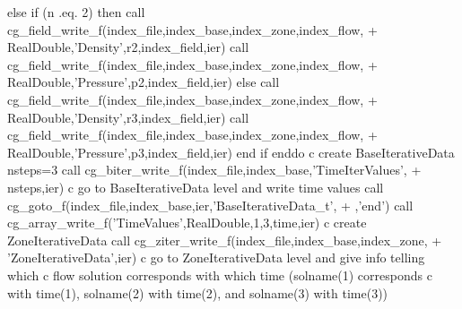 \documentclass[12pt]{article}
\begin{document}
{\newline\indent      else if (n .eq. 2) then
\newline\indent      call cg\_field\_write\_f(index\_file,index\_base,index\_zone,index\_flow,
\newline + \indent RealDouble,'Density',r2,index\_field,ier)
\newline\indent      call cg\_field\_write\_f(index\_file,index\_base,index\_zone,index\_flow,
\newline + \indent RealDouble,'Pressure',p2,index\_field,ier)
\newline\indent      else
\newline\indent      call cg\_field\_write\_f(index\_file,index\_base,index\_zone,index\_flow,
\newline + \indent RealDouble,'Density',r3,index\_field,ier)
\newline\indent      call cg\_field\_write\_f(index\_file,index\_base,index\_zone,index\_flow,
\newline + \indent RealDouble,'Pressure',p3,index\_field,ier)
\newline\indent      end if
\newline\indent      enddo
\newline c   create BaseIterativeData
\newline\indent      nsteps=3
\newline\indent      call cg\_biter\_write\_f(index\_file,index\_base,'TimeIterValues',
\newline + \indent nsteps,ier)
\newline c   go to BaseIterativeData level and write time values
\newline\indent      call cg\_goto\_f(index\_file,index\_base,ier,'BaseIterativeData\_t',
\newline + ,'end')
\newline\indent      call cg\_array\_write\_f('TimeValues',RealDouble,1,3,time,ier)
\newline c   create ZoneIterativeData
\newline\indent      call cg\_ziter\_write\_f(index\_file,index\_base,index\_zone,
\newline + \indent 'ZoneIterativeData',ier)
\newline c   go to ZoneIterativeData level and give info telling which
\newline c   flow solution corresponds with which time (solname(1) corresponds
\newline c   with time(1), solname(2) with time(2), and solname(3) with time(3))
}
\end{document}
